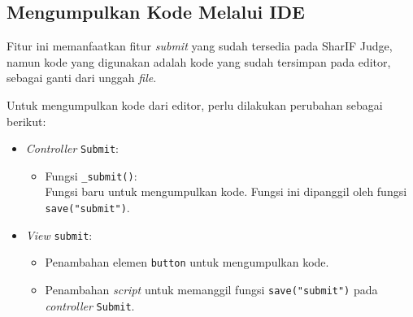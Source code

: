\subsection{Mengumpulkan Kode Melalui IDE}
\label{subsec:4:kumpul}

Fitur ini memanfaatkan fitur \textit{submit} yang sudah tersedia pada SharIF Judge, namun kode yang digunakan adalah kode yang sudah tersimpan pada editor, sebagai ganti dari unggah \textit{file}. 

Untuk mengumpulkan kode dari editor, perlu dilakukan perubahan sebagai berikut:
\begin{itemize}
	\item \textit{Controller} \verb|Submit|:
    \begin{itemize}
		\item Fungsi \verb|_submit()|: \\ Fungsi baru untuk mengumpulkan kode. Fungsi ini dipanggil oleh fungsi \verb|save("submit")|.
    \end{itemize}
    \item \textit{View} \verb|submit|:
    \begin{itemize}
        \item Penambahan elemen \verb|button| untuk mengumpulkan kode.
        \item Penambahan \textit{script} untuk memanggil fungsi \verb|save("submit")| pada \textit{controller} \verb|Submit|. 
    \end{itemize}
\end{itemize}
